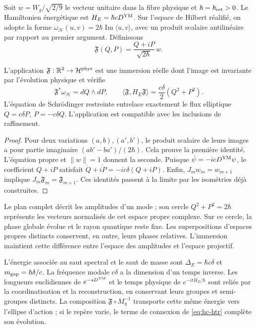 Soit \(w=W_g/\sqrt{2/9}\) le vecteur unitaire dans la fibre physique et
\(\hbar=\hbar_{\rm ret}>0\). Le Hamiltonien énergétique est
\(H_E=\hbar cD^{\rm YM}\). Sur l’espace de Hilbert réalifié,
on adopte la forme \(\omega_{\mathcal H}(u,v)=2\hbar
\operatorname{Im}\langle u,v\rangle\), avec un produit scalaire antilinéaire
par rapport au premier argument. Définissons
\begin{equation}
 \mathfrak F(Q,P)=\frac{Q+iP}{\sqrt{2\hbar}}\,w.
 \label{eq:hc-ym-embedding}
\end{equation}

\begin{theorem}
\label{thm:hc-ym-oscillator}
L’application \(\mathfrak F:\mathbb R^2\to\mathcal H^{\rm phys}\)
est une immersion réelle dont l’image est invariante par l’évolution physique et
vérifie
\begin{equation}
 \mathfrak F^*\omega_{\mathcal H}=dQ\wedge dP,
 \qquad
 \langle\mathfrak F,H_E\mathfrak F\rangle
 =\frac{c\delta}{2}(Q^2+P^2).
 \label{eq:hc-ym-energy-pullback}
\end{equation}
L'équation de Schrödinger restreinte entrelace exactement le flux elliptique \(\dot Q=c\delta P,\ \dot P=-c\delta Q\). L'application est compatible avec les inclusions de raffinement.
\end{theorem}
\begin{proof}
Pour deux variations \((a,b),(a',b')\), le produit scalaire de leurs
images a pour partie imaginaire \((ab'-ba')/(2\hbar)\).
Cela prouve la première identité. L’équation propre et \(\|w\|=1\)
donnent la seconde. Puisque
\(\dot\psi=-icD^{\rm YM}\psi\), le coefficient \(Q+iP\)
satisfait \(\dot Q+i\dot P=-ic\delta(Q+iP)\).
Enfin, \(J_mw_m=w_{m+1}\) implique
\(J_m\mathfrak F_m=\mathfrak F_{m+1}\). Ces identités passent à la
limite par les isométries déjà construites.
\end{proof}

Le plan complet décrit les amplitudes d’un mode ; son cercle
\(Q^2+P^2=2\hbar\) représente les vecteurs normalisés de cet
espace propre complexe. Sur ce cercle, la phase globale évolue et le
rayon quantique reste fixe. Les superpositions d’espaces propres distincts
conservent, en outre, leurs phases relatives. L’immersion maintient cette
différence entre l’espace des amplitudes et l’espace projectif.

L'énergie associée au saut spectral et le saut de masse sont \(\Delta_E=\hbar c\delta\) et \(m_{\rm gap}=\hbar\delta/c\). La fréquence modale \(c\delta\) a la dimension d'un temps inverse. Les longueurs euclidiennes de \(e^{-sD^{\rm YM}}\) et le temps physique de \(e^{-itH_E/\hbar}\) sont reliés par la coordinatisation et la reconstruction, en conservant leurs groupes et semi-groupes distincts. La composition \(\mathfrak F\circ M_\eta^{-1}\) transporte cette même énergie vers l'ellipse d'action ; si le repère varie, le terme de connexion de \eqref{eq:hc-htr} complète son évolution.

